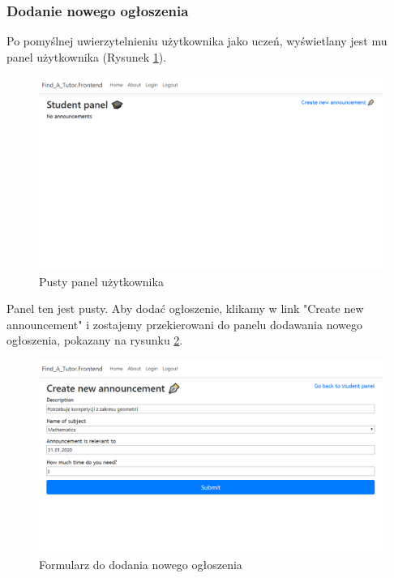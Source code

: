 \documentclass[12pt]{article}
\numberwithin{figure}{section}
\begin{document}
\begin{sloppypar}
\subsubsection{Dodanie nowego ogłoszenia}
Po pomyślnej uwierzytelnieniu użytkownika jako uczeń, wyświetlany jest mu panel użytkownika (Rysunek \ref{fig:student-empty}).
\begin{figure}[!htbp] 
    \centering
    \includegraphics[width=1\textwidth]{images/chapter_4/student-empty.png}
    \caption{Pusty panel użytkownika}
    \label{fig:student-empty}
\end{figure}

Panel ten jest pusty. Aby dodać ogłoszenie, klikamy w link "Create new announcement" i zostajemy przekierowani do panelu dodawania nowego ogłoszenia, pokazany na rysunku \ref{fig:create-new}.
\begin{figure}[!htbp] 
    \centering
    \includegraphics[width=1\textwidth]{images/chapter_4/create-new.png}
    \caption{Formularz do dodania nowego ogłoszenia}
    \label{fig:create-new}
\end{figure}


\end{sloppypar}
\end{document}
